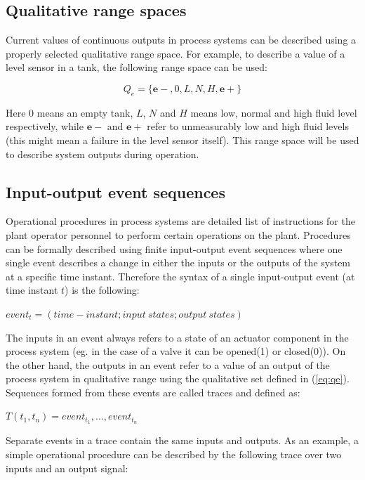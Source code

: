 \documentclass[conference]{IEEEtran}
\begin{document}
\subsection{Qualitative range spaces}
\label{sec:qualrngspc}
Current values of continuous outputs in process systems can be described using a properly selected qualitative range space. For example, to describe a value of a level sensor in a tank, the following range space can be used:

\begin{equation}
\label{eq:qe}
Q_e=\{\mathbf{e-},0,L,N,H,\mathbf{e+}\}
\end{equation}

Here $0$ means an empty tank, $L$, $N$ and $H$ means low, normal and high fluid level respectively, while $\mathbf{e-}$ and $\mathbf{e+}$ refer to unmeasurably low and high fluid levels (this might mean a failure in the level sensor itself). This range space will be used to describe system outputs during operation.

\subsection{Input-output event sequences}
\label{sec:ioseq}

Operational procedures in process systems are detailed list of instructions for the plant operator personnel to perform certain operations on the plant. Procedures can be formally described using finite input-output event sequences where one single event describes a change in either the inputs or the outputs of the system at a specific time instant. Therefore the syntax of a single input-output event (at time instant $t$) is the following:

$event_t=(time-instant;{input~states};{output~states})$

The inputs in an event always refers to a state of an actuator component in the process system (eg. in the case of a valve it can be opened(1) or closed(0)). On the other hand, the outputs in an event refer to a value of an output of the process system in qualitative range using the qualitative set defined in (\ref{eq:qe}). Sequences formed from these events are called traces and defined as:

$T(t_1,t_n)={event_{t_1},...,event_{t_n}}$

Separate events in a trace contain the same inputs and outputs. As an example, a simple operational procedure can be described by the following trace over two inputs and an output signal:
\end{document}
